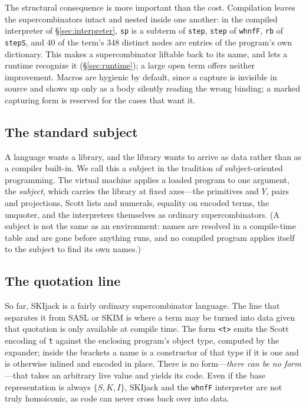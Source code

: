 \documentclass[english,submission,code=tt]{programming}
\begin{document}
The structural consequence is more important than the cost.  Compilation
leaves the supercombinators intact and nested inside one another:  in 
the compiled interpreter of \S\ref{sec:interpreter}, \texttt{sp} is a 
subterm of \texttt{step}, \texttt{step} of \texttt{whnfF}, \texttt{rb} 
of \texttt{stepS}, and 40 of the term's 348 distinct nodes are entries 
of the program's own dictionary.  This makes a supercombinator 
liftable back to its name, and lets a runtime recognize it
(\S\ref{sec:runtime}); a large open term offers neither improvement.  
Macros are hygienic by default, since a capture is invisible in source 
and shows up only as a body silently reading the wrong binding; a 
marked capturing form is reserved for the cases that want it.

\subsection{The standard subject}\label{sec:standard-subject}

A language wants a library, and the library wants to
arrive as data rather than as a compiler built-in.  We call this a
subject in the tradition of subject-oriented programming.  The
virtual machine applies a loaded program to one argument, the
\emph{subject}, which carries the library at fixed axes---the
primitives and $Y$, pairs and projections, Scott lists and numerals, 
equality on encoded terms, the unquoter, and the interpreters
themselves as ordinary supercombinators.  (A subject is not the same as
an environment: names are resolved in a compile-time table and are gone 
before anything runs, and no compiled program applies itself to the 
subject to find its own names.)


\subsection{The quotation line}\label{sec:quotation-line}

So far, SKIjack is a fairly ordinary supercombinator language.  The
line that separates it from SASL or SKIM is where a term may be turned
into data given that quotation is only available at compile time.
The form \texttt{<t>} emits the Scott encoding of \texttt{t}
against the enclosing program's object type, computed by the expander;
inside the brackets a name is a constructor of that type if it is one
and is otherwise inlined and encoded in place.  There is no
form---\emph{there can be no form}---that takes an arbitrary live value 
and yields its code.  Even if the base representation is always $\{S,K,
I\}$, SKIjack and the \texttt{whnfF} interpreter are not truly 
homoiconic, as code can never cross back over into data.
\end{document}
